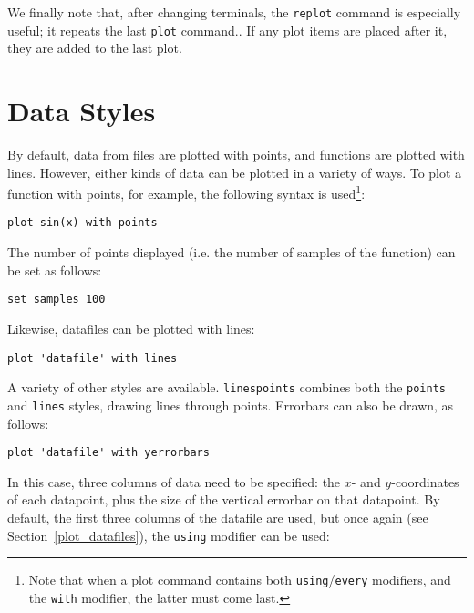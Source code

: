 \documentclass[a4paper,onecolumn,11pt]{book}
\begin{document}
We finally note that, after changing terminals, the \texttt{replot} command is
especially useful; it repeats the last \texttt{plot} command.. If any plot items are placed after it, they
are added to the last plot.

\section{Data Styles}

By default, data from files are plotted with points, and functions are plotted
with lines. However, either kinds of data can be plotted in a variety of ways.
To plot a function with points, for example, the following syntax is
used\footnote{Note that when a plot command contains both
\texttt{using}/\texttt{every} modifiers, and the \texttt{with} modifier, the
latter must come last.}:

\begin{verbatim}
plot sin(x) with points
\end{verbatim}

\noindent The number of points displayed (i.e. the number of samples of the
function) can be set as follows:

\begin{verbatim}
set samples 100
\end{verbatim}

Likewise, datafiles can be plotted with lines:

\begin{verbatim}
plot 'datafile' with lines
\end{verbatim}

A variety of other styles are available. \texttt{linespoints} combines both the
\texttt{points} and \texttt{lines} styles, drawing lines through points.
Errorbars can also be drawn, as follows:

\begin{verbatim}
plot 'datafile' with yerrorbars
\end{verbatim}

\noindent In this case, three columns of data need to be specified: the $x$-
and $y$-coordinates of each datapoint, plus the size of the vertical errorbar
on that datapoint. By default, the first three columns of the datafile are
used, but once again (see Section~\ref{plot_datafiles}), the \texttt{using}
modifier can be used:
\end{document}
